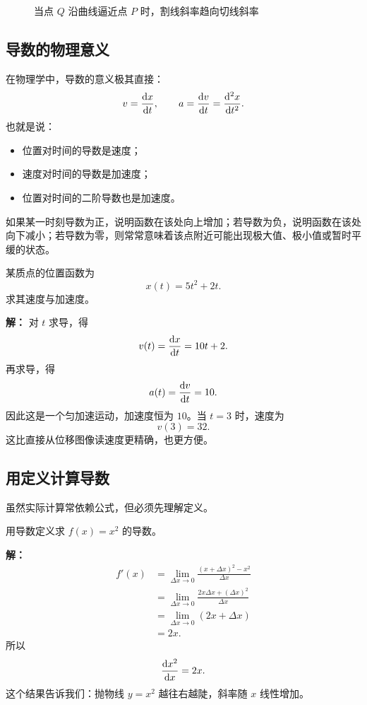 \begin{figure}[H]
  \centering
  \caption{当点 $Q$ 沿曲线逼近点 $P$ 时，割线斜率趋向切线斜率}
\end{figure}

\subsection{导数的物理意义}

在物理学中，导数的意义极其直接：
\[
  v = \dv{x}{t}, \qquad a = \dv{v}{t} = \dv[2]{x}{t}.
\]
也就是说：
\begin{itemize}
  \item 位置对时间的导数是速度；
  \item 速度对时间的导数是加速度；
  \item 位置对时间的二阶导数也是加速度。
\end{itemize}

如果某一时刻导数为正，说明函数在该处向上增加；若导数为负，说明函数在该处向下减小；若导数为零，则常常意味着该点附近可能出现极大值、极小值或暂时平缓的状态。

\begin{example}
某质点的位置函数为
\[
  x(t) = 5t^2 + 2t.
\]
求其速度与加速度。

\textbf{解：} 对 $t$ 求导，得
\[
  v(t) = \dv{x}{t} = 10t + 2.
\]
再求导，得
\[
  a(t) = \dv{v}{t} = 10.
\]
因此这是一个匀加速运动，加速度恒为 $10$。当 $t=3$ 时，速度为
\[
  v(3)=32.
\]
这比直接从位移图像读速度更精确，也更方便。
\end{example}

\subsection{用定义计算导数}

虽然实际计算常依赖公式，但必须先理解定义。

\begin{example}
用导数定义求 $f(x)=x^2$ 的导数。

\textbf{解：}
\begin{align*}
  f'(x)
  &= \lim_{\Delta x\to 0} \frac{(x+\Delta x)^2-x^2}{\Delta x} \\
  &= \lim_{\Delta x\to 0} \frac{2x\Delta x + (\Delta x)^2}{\Delta x} \\
  &= \lim_{\Delta x\to 0} (2x + \Delta x) \\
  &= 2x.
\end{align*}
所以
\[
  \dv{x^2}{x} = 2x.
\]
这个结果告诉我们：抛物线 $y=x^2$ 越往右越陡，斜率随 $x$ 线性增加。
\end{example}


